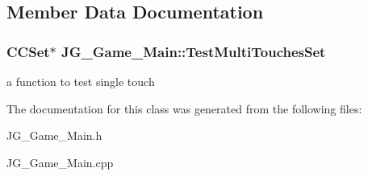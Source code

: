 \subsection{Member Data Documentation}
\hypertarget{class_j_g___game___main_abf4ca18c92688188dcf7bf60c73fa3ae}{
\subsubsection[{Test\-Multi\-Touches\-Set}]{\setlength{\rightskip}{0pt plus 5cm}C\-C\-Set$\ast$ J\-G\-\_\-\-Game\-\_\-\-Main\-::\-Test\-Multi\-Touches\-Set}}\label{class_j_g___game___main_abf4ca18c92688188dcf7bf60c73fa3ae}
a function to test single touch 

The documentation for this class was generated from the following files\-:\begin{DoxyCompactItemize}
\item 
J\-G\-\_\-\-Game\-\_\-\-Main.\-h\item 
J\-G\-\_\-\-Game\-\_\-\-Main.\-cpp\end{DoxyCompactItemize}
